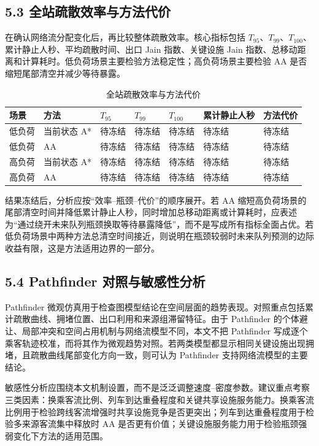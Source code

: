 \documentclass[UTF8,a4paper,12pt]{ctexart}
\begin{document}
\subsection{5.3 全站疏散效率与方法代价}

在确认网络流分配变化后，再比较整体疏散效率。核心指标包括 \(T_{95}\)、\(T_{99}\)、\(T_{100}\)、累计静止人秒、平均疏散时间、出口 Jain 指数、关键设施 Jain 指数、总移动距离和计算耗时。低负荷场景主要检验方法稳定性；高负荷场景主要检验 AA 是否缩短尾部清空并减少等待暴露。

\begin{table}[htbp]
\centering
\caption{全站疏散效率与方法代价}
\small
\begin{tabular}{p{}p{}p{}p{}p{}p{}p{}}
\toprule
场景 & 方法 & \(T_{95}\) & \(T_{99}\) & \(T_{100}\) & 累计静止人秒 & 方法代价 \\
\midrule
低负荷 & 当前状态 A* & 待冻结 & 待冻结 & 待冻结 & 待冻结 & 待冻结 \\
低负荷 & AA & 待冻结 & 待冻结 & 待冻结 & 待冻结 & 待冻结 \\
高负荷 & 当前状态 A* & 待冻结 & 待冻结 & 待冻结 & 待冻结 & 待冻结 \\
高负荷 & AA & 待冻结 & 待冻结 & 待冻结 & 待冻结 & 待冻结 \\
\bottomrule
\end{tabular}
\end{table}

结果冻结后，分析应按“效率--瓶颈--代价”的顺序展开。若 AA 缩短高负荷场景的尾部清空时间并降低累计静止人秒，同时增加总移动距离或计算耗时，应表述为“通过绕开未来队列瓶颈换取等待暴露降低”，而不是写成所有指标全面占优。若低负荷场景中两种方法总清空时间接近，则说明在瓶颈较弱时未来队列预测的边际收益有限，这是方法适用边界的一部分。

\subsection{5.4 Pathfinder 对照与敏感性分析}

Pathfinder 微观仿真用于检查图模型结论在空间层面的趋势表现。对照重点包括累计疏散曲线、拥堵位置、出口利用和来源组滞留特征。由于 Pathfinder 的个体避让、局部冲突和空间占用机制与网络流模型不同，本文不把 Pathfinder 写成逐个乘客轨迹校准，而将其作为微观趋势对照。若两类模型都显示相同关键设施出现拥堵，且疏散曲线尾部变化方向一致，则可认为 Pathfinder 支持网络流模型的主要结论。

敏感性分析应围绕本文机制设置，而不是泛泛调整速度--密度参数。建议重点考察三类因素：换乘客流比例、列车到达重叠程度和关键共享设施服务能力。换乘客流比例用于检验跨线客流增强时共享设施竞争是否更突出；列车到达重叠程度用于检验多来源客流集中释放时 AA 是否更有价值；关键设施服务能力用于检验瓶颈强弱变化下方法的适用范围。
\end{document}
